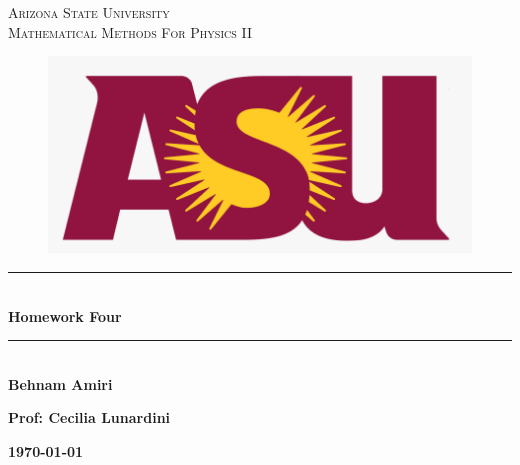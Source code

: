 \documentclass[fleqn]{article}
\begin{document}
  \begin{titlepage}

    \newcommand{\HRule}{\rule{\linewidth}{0.5mm}} %

    \center %



    \textsc{\LARGE Arizona State University}\\[1.5cm] %

    \textsc{\LARGE Mathematical Methods For Physics II }\\[1.5cm] %


    \begin{figure}
      \includegraphics[width=\linewidth]{asu.png}
    \end{figure}


    \HRule \\[0.4cm]
    { \huge \bfseries Homework Four}\\[0.4cm] 
    \HRule \\[1.5cm]

    \textbf{Behnam Amiri}

    \bigbreak

    \textbf{Prof: Cecilia Lunardini}

    \bigbreak


    \textbf{{\large \today}\\[2cm]}

    \vfill %

  \end{titlepage}
\end{document}
